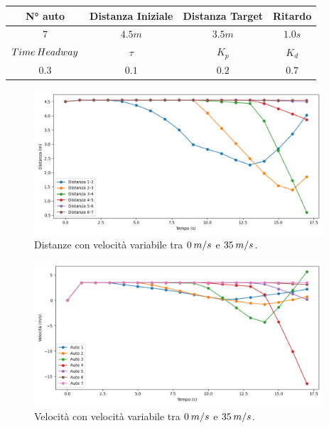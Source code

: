\begin{table}[h]
    \centering
    \begin{tabular}{|c|c|c|c|}
        \hline
        N° auto & Distanza Iniziale & Distanza Target & Ritardo \\
        \hline
        $7$ & $4.5 m$ & $3.5 m$ & $1.0 s$ \\
        \hline
        $Time\hspace{0.2em}Headway$ & $\tau$ & $K_p$ & $K_d$  \\
        \hline
        $0.3$ & $0.1$ & $0.2$ & $0.7$ \\
        \hline
    \end{tabular}
\end{table}

\begin{figure}[H]
    \includegraphics[width=0.96\textwidth]{images/5-experiment/compost/distance_e+.png}
    \caption{Distanze con velocità variabile tra $0\hspace{0.2em}m/s$ e $35\hspace{0.2em}m/s$.}
    \label{fig:e-compost-distance}
\end{figure}

\begin{figure}[H]
    \includegraphics[width=0.96\textwidth]{images/5-experiment/compost/velocity_e+.png}
    \caption{Velocità con velocità variabile tra $0\hspace{0.2em}m/s$ e $35\hspace{0.2em}m/s$.}
    \label{fig:e-compost-velocity}
\end{figure}




